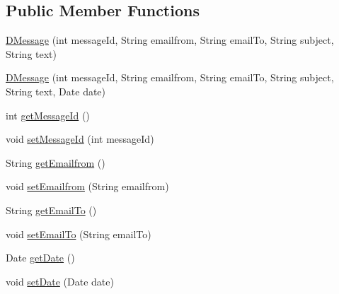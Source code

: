 \subsection*{Public Member Functions}
\begin{DoxyCompactItemize}
\item 
\mbox{\hyperlink{classes_1_1deusto_1_1bspq18_1_1e6_1_1_deusto_box_1_1_server_1_1jdo_1_1data_1_1_d_message_a9475641f6dca03094b9bfac9109a4e33}{D\+Message}} (int message\+Id, String emailfrom, String email\+To, String subject, String text)
\item 
\mbox{\hyperlink{classes_1_1deusto_1_1bspq18_1_1e6_1_1_deusto_box_1_1_server_1_1jdo_1_1data_1_1_d_message_a49e4cda98668744d5b86846e2bf714b4}{D\+Message}} (int message\+Id, String emailfrom, String email\+To, String subject, String text, Date date)
\item 
int \mbox{\hyperlink{classes_1_1deusto_1_1bspq18_1_1e6_1_1_deusto_box_1_1_server_1_1jdo_1_1data_1_1_d_message_a0c1ed6f382745c738e24b79d6d92ed13}{get\+Message\+Id}} ()
\item 
void \mbox{\hyperlink{classes_1_1deusto_1_1bspq18_1_1e6_1_1_deusto_box_1_1_server_1_1jdo_1_1data_1_1_d_message_ad50b30a2c59e10b150e1dd5c9708a2ab}{set\+Message\+Id}} (int message\+Id)
\item 
String \mbox{\hyperlink{classes_1_1deusto_1_1bspq18_1_1e6_1_1_deusto_box_1_1_server_1_1jdo_1_1data_1_1_d_message_a9dd79d091846cba5f1dd28687dadac0c}{get\+Emailfrom}} ()
\item 
void \mbox{\hyperlink{classes_1_1deusto_1_1bspq18_1_1e6_1_1_deusto_box_1_1_server_1_1jdo_1_1data_1_1_d_message_a6d27b825899db8a866aa473d78c50fd0}{set\+Emailfrom}} (String emailfrom)
\item 
String \mbox{\hyperlink{classes_1_1deusto_1_1bspq18_1_1e6_1_1_deusto_box_1_1_server_1_1jdo_1_1data_1_1_d_message_aae8aace0d699cd9251d604fb87df939d}{get\+Email\+To}} ()
\item 
void \mbox{\hyperlink{classes_1_1deusto_1_1bspq18_1_1e6_1_1_deusto_box_1_1_server_1_1jdo_1_1data_1_1_d_message_a857b9b7462290362dcd3926a3d9579b9}{set\+Email\+To}} (String email\+To)
\item 
Date \mbox{\hyperlink{classes_1_1deusto_1_1bspq18_1_1e6_1_1_deusto_box_1_1_server_1_1jdo_1_1data_1_1_d_message_a75ef9c3940726efacc96c3e117be2e57}{get\+Date}} ()
\item 
void \mbox{\hyperlink{classes_1_1deusto_1_1bspq18_1_1e6_1_1_deusto_box_1_1_server_1_1jdo_1_1data_1_1_d_message_ae36bde1dc3c33f0e2f5b467a4f35457b}{set\+Date}} (Date date)

\end{DoxyCompactItemize}
